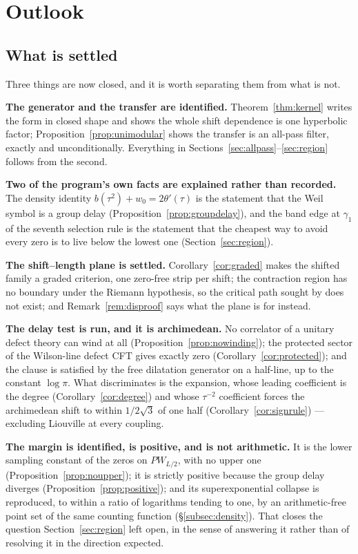 \section{Outlook}\label{sec:outlook}

\subsection{What is settled}

Three things are now closed, and it is worth separating them from what is not.

\textbf{The generator and the transfer are identified.}
Theorem~\ref{thm:kernel} writes the form in closed shape and shows the whole
shift dependence is one hyperbolic factor; Proposition~\ref{prop:unimodular}
shows the transfer is an all-pass filter, exactly and unconditionally. Everything
in Sections~\ref{sec:allpass}--\ref{sec:region} follows from the second.

\textbf{Two of the program's own facts are explained rather than recorded.} The
density identity $b(\tau^2)+w_0=2\theta'(\tau)$ is the statement that the Weil
symbol is a group delay (Proposition~\ref{prop:groupdelay}), and the band edge at
$\gamma_1$ of the seventh selection rule is the statement that the cheapest way
to avoid every zero is to live below the lowest one (Section~\ref{sec:region}).

\textbf{The shift--length plane is settled.} Corollary~\ref{cor:graded} makes the
shifted family a graded criterion, one zero-free strip per shift; the contraction
region has no boundary under the Riemann hypothesis, so the critical path sought
by \cite{CriticalPath} does not exist; and Remark~\ref{rem:disproof} says what
the plane is for instead.

\textbf{The delay test is run, and it is archimedean.} No correlator of a
unitary defect theory can wind at all (Proposition~\ref{prop:nowinding}); the
protected sector of the Wilson-line defect CFT gives exactly zero
(Corollary~\ref{cor:protected}); and the clause is satisfied by the free
dilatation generator on a half-line, up to the constant $\log\pi$. What
discriminates is the expansion, whose leading coefficient is the degree
(Corollary~\ref{cor:degree}) and whose $\tau^{-2}$ coefficient forces the
archimedean shift to within $1/2\sqrt3$ of one half
(Corollary~\ref{cor:signrule}) --- excluding Liouville at every coupling.

\textbf{The margin is identified, is positive, and is not arithmetic.} It is the
lower sampling constant of the zeros on $PW_{L/2}$, with no upper one
(Proposition~\ref{prop:noupper}); it is strictly positive because the group delay
diverges (Proposition~\ref{prop:positive}); and its superexponential collapse is
reproduced, to within a ratio of logarithms tending to one, by an arithmetic-free
point set of the same counting function (\S\ref{subsec:density}). That closes the
question Section~\ref{sec:region} left open, in the sense of answering it rather
than of resolving it in the direction expected.

